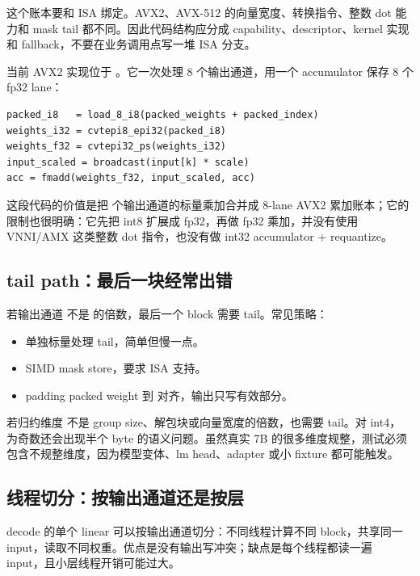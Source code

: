 这个账本要和 ISA 绑定。AVX2、AVX-512 的向量宽度、转换指令、整数 dot 能力和 mask tail 都不同。因此代码结构应分成 capability、descriptor、kernel 实现和 fallback，不要在业务调用点写一堆 ISA 分支。

当前 AVX2 实现位于 。它一次处理 8 个输出通道，用一个  accumulator 保存 8 个 fp32 lane：

\begin{lstlisting}[numbers=none,caption={当前 AVX2 kernel 的核心语义}]
packed_i8   = load_8_i8(packed_weights + packed_index)
weights_i32 = cvtepi8_epi32(packed_i8)
weights_f32 = cvtepi32_ps(weights_i32)
input_scaled = broadcast(input[k] * scale)
acc = fmadd(weights_f32, input_scaled, acc)
\end{lstlisting}

这段代码的价值是把  个输出通道的标量乘加合并成 8-lane AVX2 累加账本；它的限制也很明确：它先把 int8 扩展成 fp32，再做 fp32 乘加，并没有使用 VNNI/AMX 这类整数 dot 指令，也没有做 int32 accumulator + requantize。

\subsection{tail path：最后一块经常出错}

若输出通道  不是  的倍数，最后一个 block 需要 tail。常见策略：

\begin{itemize}
  \item 单独标量处理 tail，简单但慢一点。
  \item SIMD mask store，要求 ISA 支持。
  \item padding packed weight 到  对齐，输出只写有效部分。
\end{itemize}

若归约维度  不是 group size、解包块或向量宽度的倍数，也需要 tail。对 int4， 为奇数还会出现半个 byte 的语义问题。虽然真实 7B 的很多维度规整，测试必须包含不规整维度，因为模型变体、lm head、adapter 或小 fixture 都可能触发。

\subsection{线程切分：按输出通道还是按层}

decode 的单个 linear 可以按输出通道切分：不同线程计算不同  block，共享同一 input，读取不同权重。优点是没有输出写冲突；缺点是每个线程都读一遍 input，且小层线程开销可能过大。

